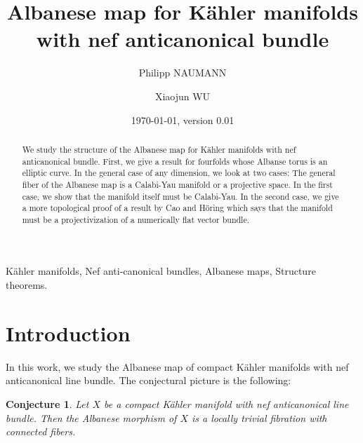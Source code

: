 \documentclass[a4, 12pt]{amsart}
\numberwithin{equation}{section}
\newtheorem{bigconj}{Conjecture}
\theoremstyle{definition}
\begin{document}
\title[Albanese map for K\"ahler manifolds with nef anticanonical bundle]
{Albanese map for K\"ahler manifolds \\ with nef anticanonical bundle}

\author{Philipp NAUMANN}
\address{Institut fur Mathematik, Universit\"at Bayreuth, 95440 Bayreuth, Germany}

\author{Xiaojun WU}
\address{Institut fur Mathematik, Universit\"at Bayreuth, 95440 Bayreuth, Germany.}



\date{\today, version 0.01}

\renewcommand{\subjclassname}{%
\textup{2010} Mathematics Subject Classification}

\keywords
{K\"ahler manifolds,  
Nef anti-canonical bundles, 
Albanese maps,
Structure theorems.
}

\maketitle

\begin{abstract}
We study the structure of the Albanese map for K\"ahler manifolds with nef anticanonical bundle. First, we give a result for fourfolds whose Albanse torus is an elliptic curve. In the general case of any dimension, we look at two cases: The general fiber of the Albanese map is a Calabi-Yau manifold or a projective space. In the first case, we show that the manifold itself must be Calabi-Yau. In the second case, we give a more topological proof of a result by Cao and H\"oring which says that the manifold must be a projectivization of a numerically flat vector bundle.
\end{abstract}




\section{Introduction}
In this work, we study the Albanese map of compact K\"ahler manifolds with nef anticanonical line bundle.
The conjectural picture is the following:

\begin{bigconj}
Let $X$ be a compact K\"ahler manifold with nef anticanonical line bundle.
Then the Albanese morphism of $X$ is a locally trivial fibration with connected fibers.
\end{bigconj}
\end{document}

